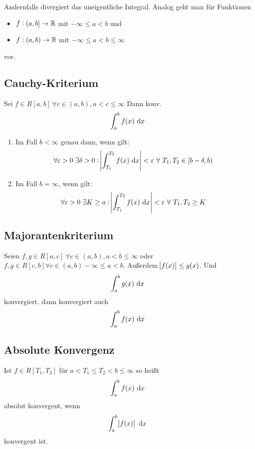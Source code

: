 Andernfalls divergiert das uneigentliche Integral.
Analog geht man für Funktionen
\begin{itemize}
    \item $f: (a, b] \rightarrow \mathbb{R}$ mit $-\infty \leq a < b$ und
    \item $f: (a, b) \rightarrow \mathbb{R}$ mit $-\infty \leq a < b \leq \infty$
\end{itemize}
vor.

\subsection{Cauchy-Kriterium}
Sei $f \in R[a,b]\ \forall c \in (a,b), a < c \leq \infty$ Dann konv.
\begin{equation*}
    \int_a^b f(x) \text{ d}x
\end{equation*}
\begin{enumerate}[label= (\alph*)]
    \item Im Fall $b<\infty$ genau dann, wenn gilt:
        \begin{equation*}
            \forall \varepsilon > 0\ \exists \delta > 0: \abs{\int_{T_1}^{T_2} f(x) \text{ d}x} < \varepsilon\ \forall~T_1, T_2 \in [b - \delta, b)
        \end{equation*}
    \item Im Fall $b = \infty$, wenn gilt:
        \begin{equation*}
                \forall \varepsilon > 0\ \exists K \geq a: \abs{\int_{T_1}^{T_2} f(x) \dx} < \varepsilon\ \forall~T_1, T_2 \geq K
        \end{equation*}
\end{enumerate}

\subsection{Majorantenkriterium}
Seien $f, g \in R[a, c]\ \forall c \in (a,b), a < b \leq \infty$ oder
$f, g \in R[c, b] \forall c \in (a, b) -\infty \leq a < b$.
Außerdem $\abs{f(x)} \leq g(x)$. Und
\begin{equation*}
    \int_a^b g(x) \text{ d}x
\end{equation*}
konvergiert, dann konvergiert auch
\begin{equation*}
    \int_a^b f(x) \text{ d}x
\end{equation*}

\subsection{Absolute Konvergenz}
Ist $f \in R[T_1, T_2]$ für $a < T_1 \leq T_2 < b \leq \infty$ so heißt
\begin{equation*}
    \int_a^b f(x) \text{ d}x
\end{equation*}
absolut konvergent, wenn
\begin{equation*}
    \int_a^b \abs{f(x)} \text{ d}x
\end{equation*}
konvergent ist.

